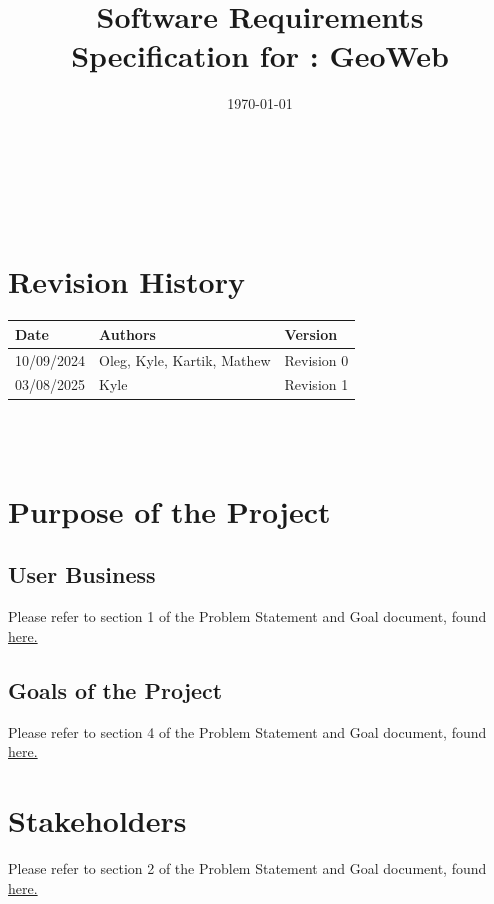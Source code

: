 \documentclass[12pt]{article}
\begin{document}
\title{Software Requirements Specification for \progname: GeoWeb} 
\author{\authname}
\date{\today}
	
\maketitle

~\newpage


\tableofcontents

~\newpage

\section*{Revision History}

\begin{tabularx}{\textwidth}{p{3cm}p{2cm}X}
\toprule {\textbf{Date}} & {\textbf{Authors}} & {\textbf{Version}}\\
\midrule
10/09/2024 & Oleg, Kyle, Kartik, Mathew & Revision 0\\
\midrule
03/08/2025 & Kyle & Revision 1\\
\bottomrule
\end{tabularx}

~\\

~\newpage
\section{Purpose of the Project}
\subsection{User Business}
Please refer to section 1 of the Problem Statement and Goal document, found \href{https://github.com/OKKM-insights/OKKM.insights/blob/main/docs/ProblemStatementAndGoals/ProblemStatement.pdf}{here.}

\subsection{Goals of the Project}
Please refer to section 4 of the Problem Statement and Goal document, found \href{https://github.com/OKKM-insights/OKKM.insights/blob/main/docs/ProblemStatementAndGoals/ProblemStatement.pdf}{here.}

\section{Stakeholders}
Please refer to section 2 of the Problem Statement and Goal document, found \href{https://github.com/OKKM-insights/OKKM.insights/blob/main/docs/ProblemStatementAndGoals/ProblemStatement.pdf}{here.}
\end{document}
